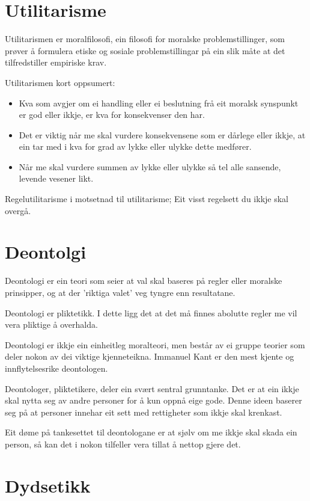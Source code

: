 \documentclass[a4paper]{IEEEtran}
\begin{document}
\bigskip
\section{Utilitarisme}
\label{utilitarisme}

Utilitarismen er moralfilosofi, ein filosofi for moralske problemstillinger, som prøver å formulera etiske og sosiale problemstillingar på ein slik måte at det tilfredstiller empiriske krav.
\bigskip

Utilitarismen kort oppsumert:\bigskip
\begin{itemize}
    \item Kva som avgjer om ei handling eller ei beslutning frå eit moralsk synspunkt er god eller ikkje, er kva for konsekvenser den har.
    \item Det er viktig når me skal vurdere konsekvensene som er dårlege eller ikkje, at ein tar med i kva for grad av lykke eller ulykke dette medfører.
    \item Når me skal vurdere summen av lykke eller ulykke så tel alle sansende, levende vesener likt. 
\end{itemize}\bigskip

Regelutilitarisme i motsetnad til utilitarisme; Eit visst regelsett du ikkje skal overgå.

\bigskip
\section{Deontolgi}
\label{deontologi}

Deontologi er ein teori som seier at val skal baseres på regler eller moralske prinsipper, og at der 'riktiga valet' veg tyngre enn resultatane.

Deontologi er pliktetikk. I dette ligg det at det må finnes abolutte regler me vil vera pliktige å overhalda. 

Deontologi er ikkje ein einheitleg moralteori, men består av ei gruppe teorier som deler nokon av dei viktige kjenneteikna. Immanuel Kant er den mest kjente og innflytelsesrike deontologen.

Deontologer, pliktetikere, deler ein svært sentral grunntanke. Det er at ein ikkje skal nytta seg av andre personer for å kun oppnå eige gode. Denne ideen baserer seg på at personer innehar eit sett med rettigheter som ikkje skal krenkast. 

Eit døme på tankesettet til deontologane er at sjølv om me ikkje skal skada ein person, så kan det i nokon tilfeller vera tillat å nettop gjere det. 
\section{Dydsetikk}
\label{dydsetikk}\bigskip
\end{document}
